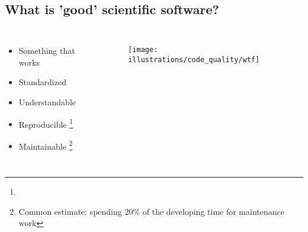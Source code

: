 \documentclass[usenames,dvipsnames]{beamer}
\theoremstyle{plain}
\theoremstyle{definition}
\begin{document}
\begin{frame}{\setframetitle{}}
{
        \begin{figure}
         {}
       \end{figure}
}
\end{frame}



\subsection{What is 'good' scientific software?}


\begin{frame}{\setframetitle{}}
  {
    \begin{columns}[t]
      \begin{itemize}
      \item Something that works

      \item Standardized
      \item Understandable
      \item Reproducible \footnote{}
      \item
\renewcommand{\thefootnote}{\fnsymbol{footnote}}
Maintainable \footnote{Common estimate: spending 20\% of the developing time
        for maintenance work }
      \end{itemize}
 \begin{figure}
        \captionsetup[subfigure]{justification=centering}
        \centering
        \subcaptionbox{}
        {\texttt{[image: illustrations/code\_quality/wtf]}}
      \end{figure}
    \end{columns}
}

\end{frame}
\end{document}

